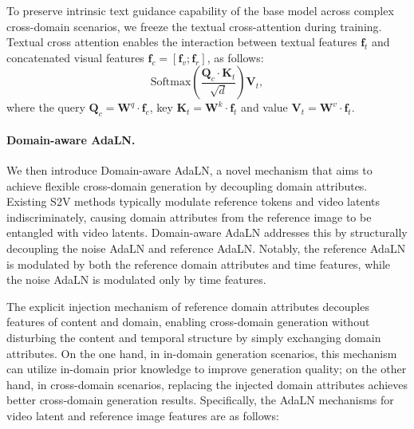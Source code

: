 \documentclass{llmxive}
\begin{document}
To preserve intrinsic text guidance capability of the base model across complex cross-domain scenarios, we freeze the textual cross-attention during training. Textual cross attention enables the interaction between textual features $\boldsymbol{f}_t$  and concatenated visual features $\boldsymbol{f}_c = [\boldsymbol{f}_v; \boldsymbol{f}_r]$, as follows:
\begin{equation}
\label{eq:attention2}
 \text{Softmax}\left( \frac{   \boldsymbol{Q}_{c} \cdot \boldsymbol{K}_{t}}{\sqrt{d}} \right)  \boldsymbol{V}_{t}, 
\end{equation}
where the query $\boldsymbol{Q}_c=\boldsymbol{W}^q\cdot \boldsymbol{f}_c$,  key  $\boldsymbol{K}_t=\boldsymbol{W}^k \cdot \boldsymbol{f}_t$ and value $\boldsymbol{V}_t=\boldsymbol{W}^v \cdot \boldsymbol{f}_t$. 


\paragraph{\textbf{Domain-aware AdaLN.}} We then introduce Domain-aware AdaLN, a novel mechanism that aims to achieve flexible cross-domain generation by decoupling domain attributes. Existing S2V methods typically modulate reference tokens and video latents indiscriminately, causing domain attributes from the reference image to be entangled with video latents. Domain-aware AdaLN addresses this by structurally decoupling the noise AdaLN and reference AdaLN. Notably, the reference AdaLN is modulated by both the reference domain attributes and time features, while the noise AdaLN is modulated only by time features.

The explicit injection mechanism of reference domain attributes decouples features of content and domain, enabling cross-domain generation without disturbing the content and temporal structure by simply exchanging domain attributes. On the one hand, in in-domain generation scenarios, this mechanism can utilize in-domain prior knowledge to improve generation quality; on the other hand, in cross-domain scenarios, replacing the injected domain attributes achieves better cross-domain generation results. Specifically, the AdaLN mechanisms for video latent and reference image features are as follows:
\end{document}
